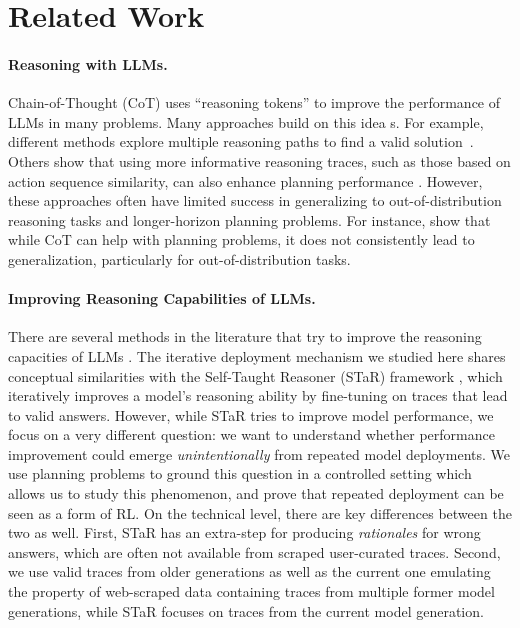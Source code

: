 \section{Related Work}

\paragraph{Reasoning with LLMs.}

Chain-of-Thought (CoT) \citep{wei-et-al-neurips2022} uses ``reasoning tokens''
to improve the performance of LLMs in many problems.  Many approaches build on
this idea s. For example,
different methods explore multiple reasoning paths to find a valid
solution~\citep{yao-et-al-neurips2023,snell-et-al-icrl2025}. Others show that
using more informative reasoning traces, such as those based on action sequence
similarity, can also enhance planning performance \citep{zhao-et-al-icrl2025}.
However, these approaches often have limited success in generalizing to
out-of-distribution reasoning tasks and longer-horizon planning problems. For
instance, \citet{stechly-et-al-neurips2024} show that while CoT can help with
planning problems, it does not consistently lead to generalization, particularly
for out-of-distribution tasks.

\paragraph{Improving Reasoning Capabilities of LLMs.}

There are several methods in the literature that try to improve the reasoning
capacities of LLMs
. The
iterative deployment mechanism we studied here shares conceptual similarities
with the Self-Taught Reasoner (STaR) framework
\cite{zelikman-et-al-neurips2022}, which iteratively improves a model's
reasoning ability by fine-tuning on traces that lead to valid answers.
However, while STaR tries to improve model performance, we focus on a very
different question: we want to understand whether performance improvement could
emerge \emph{unintentionally} from repeated model deployments. We use planning
problems to ground this question in a controlled setting which allows us to
study this phenomenon, and prove that repeated deployment can be seen as a form
of RL. On the technical level, there are key differences between the two as
well.  First, STaR has an extra-step for producing \emph{rationales} for
wrong answers, which are often not available from scraped user-curated
traces. Second, we use valid traces from older generations as well as the
current one emulating the property of web-scraped data containing traces from
multiple former model generations, while STaR focuses on traces from the current
model generation.

